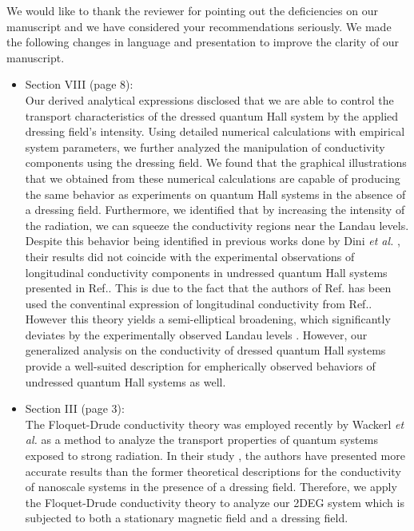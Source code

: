 \documentclass{article}
\begin{document}
We would like to thank the reviewer for pointing out the deficiencies on our manuscript and we have considered your recommendations seriously. We made the following changes in language and presentation to improve the clarity of our manuscript.

\begin{itemize}
  \item Section VIII (page 8):\\
  {\color{Maroon}
  Our derived analytical expressions disclosed that we are able to control the transport characteristics of the dressed quantum Hall system by the applied dressing field’s intensity. Using detailed numerical calculations with empirical system parameters, we further analyzed the manipulation of conductivity components using the dressing field.
  We found that the graphical illustrations that we obtained from these numerical calculations are capable of producing the same behavior as experiments on quantum Hall systems in the absence of a dressing field.
  Furthermore, we identified that by increasing the intensity of the radiation, we can squeeze the conductivity regions near the Landau levels. Despite this behavior being identified in previous works done by Dini \textit{et al.}  \cite{dini16}, their results did not coincide with the experimental observations of longitudinal conductivity components in undressed quantum Hall systems presented in Ref.\cite{endo09}. This is due to the fact that the authors of Ref.\cite{dini16} has been used the conventinal expression of longitudinal conductivity from Ref.\cite{ando74_1,ando82}. However this theory yields a semi-elliptical broadening, which significantly deviates by the experimentally observed Landau levels \cite{endo09}.
  However, our generalized analysis on the conductivity of dressed quantum Hall systems provide a well-suited description for empherically observed behaviors of undressed quantum Hall systems as well.
  }
  \item Section III (page 3):\\
  {\color{Maroon}
  The Floquet-Drude conductivity theory was employed recently by Wackerl \textit{et al.} \cite{wackerl20} as a method to analyze the transport properties of quantum systems exposed to strong radiation.
  In their study \cite{wackerl20}, the authors have presented more accurate results than the former theoretical descriptions \cite{morina15,pervishko15} for the conductivity of nanoscale systems in the  presence of a dressing field. Therefore, we apply the Floquet-Drude conductivity theory to analyze our 2DEG system which is subjected to both a stationary magnetic field and a dressing field.
}
\end{itemize}
\end{document}
